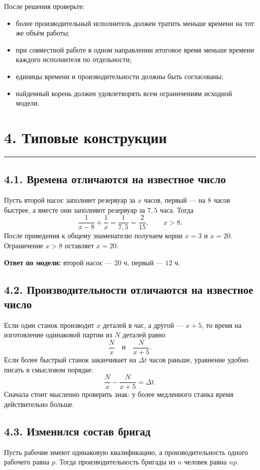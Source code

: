 \documentclass[a4paper,12pt]{article}
\newcommand{\sectionrule}{\par\vspace{-0.25em}\noindent\textcolor{accent}{\rule{\linewidth}{0.6pt}}\par\vspace{0.25em}}
\newcommand{\key}[1]{\textcolor{darkaccent}{\textbf{#1}}}
\begin{document}
После решения проверьте:
\begin{itemize}[leftmargin=1.5em,itemsep=0.2em,topsep=0.2em]
\item более производительный исполнитель должен тратить меньше времени на тот же объём работы;
\item при совместной работе в одном направлении итоговое время меньше времени каждого исполнителя по отдельности;
\item единицы времени и производительности должны быть согласованы;
\item найденный корень должен удовлетворять всем ограничениям исходной модели.
\end{itemize}

\clearpage

\section*{4. Типовые конструкции}
\sectionrule

\subsection*{4.1. Времена отличаются на известное число}
Пусть второй насос заполняет резервуар за $x$ часов, первый --- на $8$ часов быстрее, а вместе они заполняют резервуар за $7{,}5$ часа. Тогда
\[
\frac{1}{x-8}+\frac{1}{x}=\frac{1}{7{,}5}=\frac{2}{15},\qquad x>8.
\]
После приведения к общему знаменателю получаем корни $x=3$ и $x=20$. Ограничение $x>8$ оставляет $x=20$.

\key{Ответ по модели:} второй насос --- $20$ ч, первый --- $12$ ч.

\subsection*{4.2. Производительности отличаются на известное число}
Если один станок производит $x$ деталей в час, а другой --- $x+5$, то время на изготовление одинаковой партии из $N$ деталей равно
\[
\frac{N}{x}\quad\text{и}\quad\frac{N}{x+5}.
\]
Если более быстрый станок заканчивает на $\Delta t$ часов раньше, уравнение удобно писать в смысловом порядке:
\[
\frac{N}{x}-\frac{N}{x+5}=\Delta t.
\]
Сначала стоит мысленно проверить знак: у более медленного станка время действительно больше.

\subsection*{4.3. Изменился состав бригад}
Пусть рабочие имеют одинаковую квалификацию, а производительность одного рабочего равна $p$. Тогда производительность бригады из $n$ человек равна $np$.
\end{document}
